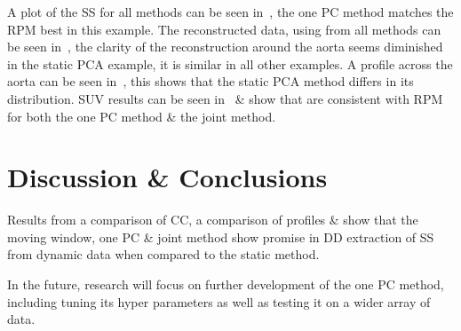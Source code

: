     A plot of the \gls{SS} for all methods can be seen in~, the one \gls{PC} method matches the \gls{RPM} best in this example. The reconstructed data, using  from all methods can be seen in~, the clarity of the reconstruction around the aorta seems diminished in the static \gls{PCA} example, it is similar in all other examples. A profile across the aorta can be seen in~, this shows that the static \gls{PCA} method differs in its distribution. \gls{SUV} results can be seen in~ \& show that  are consistent with \gls{RPM} for both the one \gls{PC} method \& the joint method.
    
\vspace{-0.5cm}
    
\section{Discussion \& Conclusions} \label{sec:discussion_and_conclusions}
    Results from a comparison of \gls{CC}, a comparison of profiles \&  show that the moving window, one \gls{PC} \& joint method show promise in \gls{DD} extraction of \gls{SS} from dynamic data when compared to the static method.
    
    In the future, research will focus on further development of the one \gls{PC} method, including tuning its hyper parameters as well as testing it on a wider array of data.
